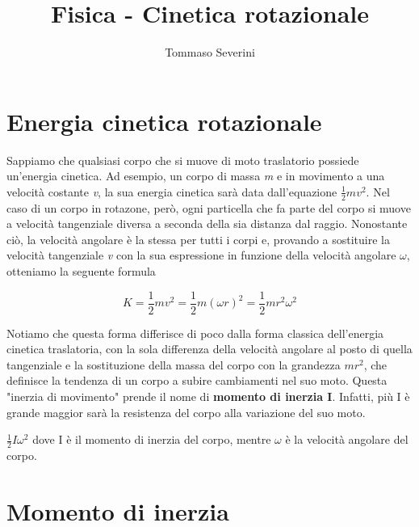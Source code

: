 \documentclass[10pt,a4paper]{article}
\author{Tommaso Severini}
\title{Fisica - Cinetica rotazionale}
\begin{document}
	\maketitle
	
	
	\section{Energia cinetica rotazionale}
	
	Sappiamo che qualsiasi corpo che si muove di moto traslatorio possiede un'energia cinetica. Ad esempio, un corpo di massa \textit{m} e in movimento a una velocità costante \textit{v}, la sua energia cinetica sarà data dall'equazione $\frac{1}{2}mv^2$.
	Nel caso di un corpo in rotazone, però, ogni particella che fa parte del corpo si muove a velocità tangenziale diversa a seconda della sia distanza dal raggio. Nonostante ciò, la velocità angolare è la stessa per tutti i corpi e, provando a sostituire la velocità tangenziale \textit{v} con la sua espressione in funzione della velocità angolare $\omega$, otteniamo la seguente formula
	
	\begin{equation}
		K = \frac{1}{2}mv^2 = \frac{1}{2}m (\omega r)^2 = \frac{1}{2}mr^2\omega^2
	\end{equation} 

	Notiamo che questa forma differisce di poco dalla forma classica dell'energia cinetica traslatoria, con la sola differenza della velocità angolare al posto di quella tangenziale e la sostituzione della massa del corpo con la grandezza $mr^2$, che definisce la tendenza di un corpo a subire cambiamenti nel suo moto. Questa "inerzia di movimento" prende il nome di \textbf{momento di inerzia I}. Infatti, più I è grande maggior sarà la resistenza del corpo alla variazione del suo moto.  
	
	\begin{definition}
		$\frac{1}{2}I \omega^2$ dove I è il momento di inerzia del corpo, mentre $\omega$ è la velocità angolare del corpo.
	\end{definition}

	\section{Momento di inerzia}
	
\end{document}
